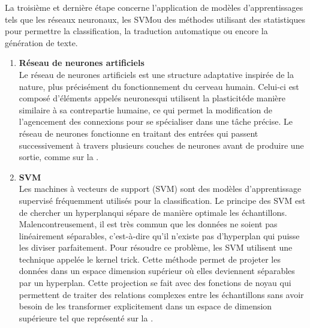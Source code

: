 \documentclass{rapport}
\begin{document}
\newpage
La troisième et dernière étape concerne l'application de modèles d'apprentissages tels que les réseaux neuronaux, les SVM\footnotemark[1] ou des méthodes utilisant des statistiques pour permettre la classification, la traduction automatique ou encore la génération de texte.  
\begin{enumerate}
    \item \textbf{Réseau de neurones artificiels}\\
    Le réseau de neurones artificiels est une structure adaptative inspirée de la nature, plus précisément du fonctionnement du cerveau humain. Celui-ci est composé d'éléments appelés neurones\footnotemark[2] qui utilisent la plasticité\footnotemark[3] de manière similaire à sa contrepartie humaine, ce qui permet la modification de l'agencement des connexions pour se spécialiser dans une tâche précise. Le réseau de neurones fonctionne en traitant des entrées qui passent successivement à travers plusieurs couches de neurones avant de produire une sortie, comme sur la . 
    
    \item \textbf{SVM}\\
    Les machines à vecteurs de support (SVM) sont des modèles d’apprentissage supervisé fréquemment utilisés pour la classification. Le principe des SVM est de chercher un hyperplan\footnotemark[4] qui sépare de manière optimale les échantillons. Malencontreusement, il est très commun que les données ne soient pas linéairement séparables, c'est-à-dire qu'il n'existe pas d'hyperplan qui puisse les diviser parfaitement. Pour résoudre ce problème, les SVM utilisent une technique appelée le kernel trick. Cette méthode permet de projeter les données dans un espace dimension supérieur où elles deviennent séparables par un hyperplan. Cette projection se fait avec des fonctions de noyau qui permettent de traiter des relations complexes entre les échantillons sans avoir besoin de les transformer explicitement dans un espace de dimension supérieure tel que représenté sur la . 
    
\end{enumerate}
\newpage
\end{document}
